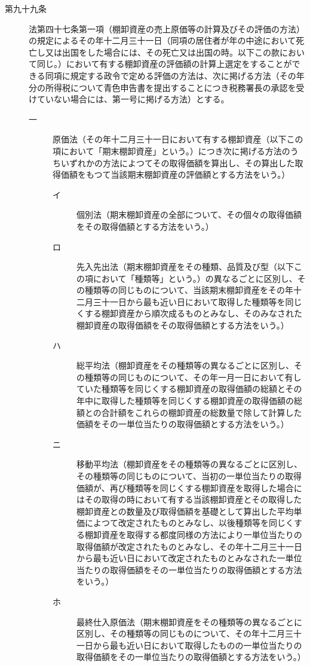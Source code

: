 \documentclass[twocolumn,a4j,10pt]{ltjtarticle}
\begin{document}
\begin{description}
\item[第九十九条]法第四十七条第一項（棚卸資産の売上原価等の計算及びその評価の方法）の規定によるその年十二月三十一日（同項の居住者が年の中途において死亡し又は出国をした場合には、その死亡又は出国の時。以下この款において同じ。）において有する棚卸資産の評価額の計算上選定をすることができる同項に規定する政令で定める評価の方法は、次に掲げる方法（その年分の所得税について青色申告書を提出することにつき税務署長の承認を受けていない場合には、第一号に掲げる方法）とする。
\begin{description}
\item[一]原価法（その年十二月三十一日において有する棚卸資産（以下この項において「期末棚卸資産」という。）につき次に掲げる方法のうちいずれかの方法によつてその取得価額を算出し、その算出した取得価額をもつて当該期末棚卸資産の評価額とする方法をいう。）
\begin{description}
\item[イ]個別法（期末棚卸資産の全部について、その個々の取得価額をその取得価額とする方法をいう。）
\item[ロ]先入先出法（期末棚卸資産をその種類、品質及び型（以下この項において「種類等」という。）の異なるごとに区別し、その種類等の同じものについて、当該期末棚卸資産をその年十二月三十一日から最も近い日において取得した種類等を同じくする棚卸資産から順次成るものとみなし、そのみなされた棚卸資産の取得価額をその取得価額とする方法をいう。）
\item[ハ]総平均法（棚卸資産をその種類等の異なるごとに区別し、その種類等の同じものについて、その年一月一日において有していた種類等を同じくする棚卸資産の取得価額の総額とその年中に取得した種類等を同じくする棚卸資産の取得価額の総額との合計額をこれらの棚卸資産の総数量で除して計算した価額をその一単位当たりの取得価額とする方法をいう。）
\item[ニ]移動平均法（棚卸資産をその種類等の異なるごとに区別し、その種類等の同じものについて、当初の一単位当たりの取得価額が、再び種類等を同じくする棚卸資産を取得した場合にはその取得の時において有する当該棚卸資産とその取得した棚卸資産との数量及び取得価額を基礎として算出した平均単価によつて改定されたものとみなし、以後種類等を同じくする棚卸資産を取得する都度同様の方法により一単位当たりの取得価額が改定されたものとみなし、その年十二月三十一日から最も近い日において改定されたものとみなされた一単位当たりの取得価額をその一単位当たりの取得価額とする方法をいう。）
\item[ホ]最終仕入原価法（期末棚卸資産をその種類等の異なるごとに区別し、その種類等の同じものについて、その年十二月三十一日から最も近い日において取得したものの一単位当たりの取得価額をその一単位当たりの取得価額とする方法をいう。）

\end{description}
\end{description}
\end{description}
\end{document}
